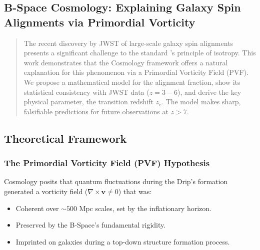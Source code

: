 \documentclass{BSpacePaper} %
\begin{document}
\begin{appendices}
\clearpage

\section{B-Space Cosmology: Explaining Galaxy Spin Alignments via Primordial Vorticity}
\label{app:spins}
\setcounter{equation}{0}
\setcounter{table}{0}
\setcounter{figure}{0}

\begin{abstract}
The recent discovery by JWST of large-scale galaxy spin alignments presents a significant challenge to the standard \lcdm{}'s principle of isotropy. This work demonstrates that the \bspace{} Cosmology framework offers a natural explanation for this phenomenon via a Primordial Vorticity Field (PVF). We propose a mathematical model for the alignment fraction, show its statistical consistency with JWST data ($z=3-6$), and derive the key physical parameter, the transition redshift $z_c$. The model makes sharp, falsifiable predictions for future observations at $z>7$.
\end{abstract}

\subsection{Theoretical Framework}

\subsubsection{The Primordial Vorticity Field (PVF) Hypothesis}
\bspace{} Cosmology posits that quantum fluctuations during the Drip's formation generated a vorticity field ($\nabla \times \mathbf{v} \neq 0$) that was:
\begin{itemize}
    \item Coherent over $\sim 500$ Mpc scales, set by the inflationary horizon.
    \item Preserved by the B-Space's fundamental rigidity.
    \item Imprinted on galaxies during a top-down structure formation process.
\end{itemize}


\end{appendices}
\end{document}
